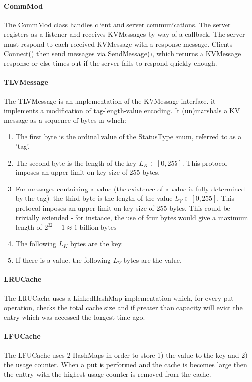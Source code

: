 \documentclass[10pt]{article}
\begin{document}
\begin{multicols}{2}
\paragraph{CommMod} The CommMod class handles client and server communications. The server registers as a listener and receives KVMessages by way of a callback. The server must respond to each received KVMessage with a response message. Clients Connect() then send messages via SendMessage(), which returns a KVMessage response or else times out if the server fails to respond quickly enough.

\paragraph{TLVMessage} The TLVMessage is an implementation of the KVMessage interface. it implements a modification of tag-length-value encoding. It (un)marshals a KV message as a sequence of bytes in which:

\begin{enumerate}
\item The first byte is the ordinal value of the StatusType enum, referred to as a 'tag'.
\item The second byte is the length of the key $L_K \in [0, 255]$. This protocol imposes an upper limit on key size of 255 bytes.
\item For messages containing a value (the existence of a value is fully determined by the tag), the third byte is the length of the value $L_V \in [0, 255]$. This protocol imposes an upper limit on key size of 255 bytes. This could be trivially extended - for instance, the use of four bytes would give a maximum length of $2^32-1\approx 1 \text{ billion bytes}$
\item The following $L_K$ bytes are the key.
\item If there is a value, the following $L_V$ bytes are the value.
\end{enumerate}

\paragraph{LRUCache} The LRUCache uses a LinkedHashMap implementation which, for every put operation, checks the total cache size and if greater than capacity will evict the entry which was accessed the longest time ago.

\paragraph{LFUCache} The LFUCache uses 2 HashMaps in order to store 1) the value to the key and 2) the usage counter. When a put is performed and the cache is becomes large then the enttry with the highest usage counter is removed from the cache.


\end{multicols}
\end{document}
